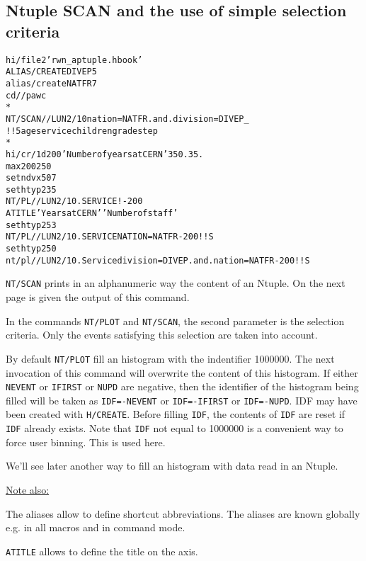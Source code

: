 \subsection*{Ntuple SCAN and the use of simple selection criteria}
\begin{alltt}
      hi/file 2 'rwn_aptuple.hbook'
     ALIAS/CREATE DIVEP 5
      alias/create NATFR 7
      cd //pawc
      *
   NT/SCAN //LUN2/10 nation=NATFR.and.division=DIVEP _
      ! ! 5 age service children grade step
      *
      hi/cr/1d 200 'Number of years at CERN' 35 0. 35.
      max 200 250
      set ndvx 507
      set htyp 235
     NT/PL //LUN2/10.SERVICE ! -200
     ATITLE 'Years at CERN' 'Number of staff'
      set htyp 253
   NT/PL //LUN2/10.SERVICE NATION=NATFR -200 ! ! S
      set htyp 250
      nt/pl //LUN2/10.Service division=DIVEP.and.nation=NATFR -200 ! ! S
\end{alltt} 
\begin{DinglistE}
\item {\tt NT/SCAN} prints in an alphanumeric way the content of an
      Ntuple. On the next page is given the output of this command.
\item In the commands {\tt NT/PLOT} and {\tt NT/SCAN}, the second parameter
      is the selection criteria. Only the
      events satisfying this selection are taken into account.
\item By default {\tt NT/PLOT} fill an histogram with the indentifier 1000000.
      The next invocation of this command will overwrite the content of this
      histogram. If either
      {\tt NEVENT} or {\tt IFIRST} or {\tt NUPD} are negative, then the
      identifier of the histogram being filled will be taken as
      {\tt IDF=-NEVENT} or {\tt IDF=-IFIRST} or {\tt IDF=-NUPD}.
      IDF may have been created with {\tt H/CREATE}. Before filling {\tt IDF},
      the contents of {\tt IDF} are reset if {\tt IDF} already exists. Note
      that {\tt IDF} not equal to 1000000 is a convenient way to force user
      binning. This is used here.

      We'll see later another way to fill an histogram with
      data read in an Ntuple.

\underline{Note also:}

\item The aliases allow to define shortcut abbreviations.
      The aliases are known globally e.g. in all macros and in command mode.
\item {\tt ATITLE} allows to define the title on the axis.
\end{DinglistE}
\clearpage
